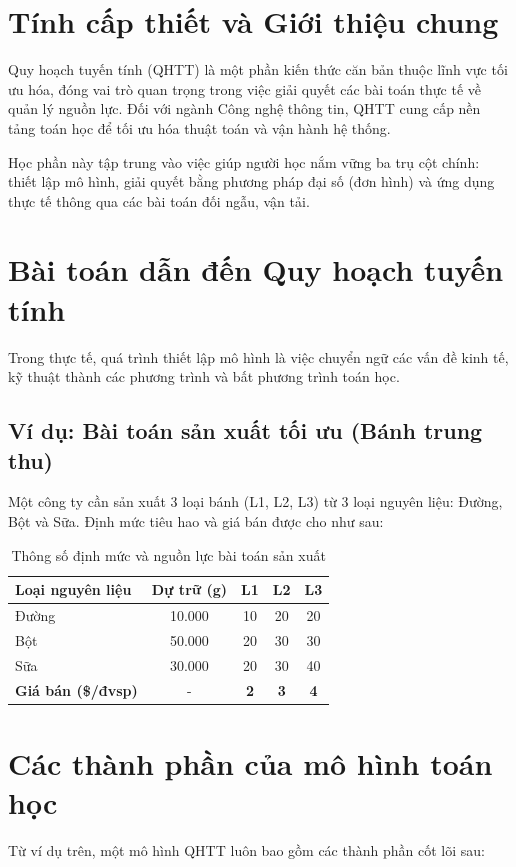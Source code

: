 \section{Tính cấp thiết và Giới thiệu chung}
Quy hoạch tuyến tính (QHTT) là một phần kiến thức căn bản thuộc lĩnh vực tối ưu hóa, đóng vai trò quan trọng trong việc giải quyết các bài toán thực tế về quản lý nguồn lực. Đối với ngành Công nghệ thông tin, QHTT cung cấp nền tảng toán học để tối ưu hóa thuật toán và vận hành hệ thống.

Học phần này tập trung vào việc giúp người học nắm vững ba trụ cột chính: thiết lập mô hình, giải quyết bằng phương pháp đại số (đơn hình) và ứng dụng thực tế thông qua các bài toán đối ngẫu, vận tải.

\section{Bài toán dẫn đến Quy hoạch tuyến tính}
Trong thực tế, quá trình thiết lập mô hình là việc chuyển ngữ các vấn đề kinh tế, kỹ thuật thành các phương trình và bất phương trình toán học.

\subsection{Ví dụ: Bài toán sản xuất tối ưu (Bánh trung thu)}
Một công ty cần sản xuất 3 loại bánh (L1, L2, L3) từ 3 loại nguyên liệu: Đường, Bột và Sữa. Định mức tiêu hao và giá bán được cho như sau:

\begin{table}[htbp]
    \centering
    \begin{tabular}{|l|c|c|c|c|}
        \hline
        \textbf{Loại nguyên liệu} & \textbf{Dự trữ (g)} & \textbf{L1} & \textbf{L2} & \textbf{L3} \\
        \hline
        Đường & 10.000 & 10 & 20 & 20 \\
        Bột & 50.000 & 20 & 30 & 30 \\
        Sữa & 30.000 & 20 & 30 & 40 \\
        \hline
        \textbf{Giá bán (\$/đvsp)} & - & \textbf{2} & \textbf{3} & \textbf{4}\\
        \hline
    \end{tabular}
    \caption{Thông số định mức và nguồn lực bài toán sản xuất }
\end{table}

\section{Các thành phần của mô hình toán học}
Từ ví dụ trên, một mô hình QHTT luôn bao gồm các thành phần cốt lõi sau:

